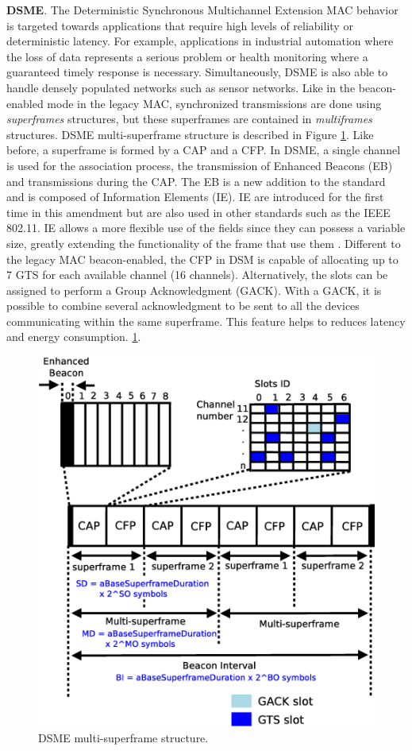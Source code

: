 \documentclass[conference]{IEEEtran}
\begin{document}
\textbf{DSME}. The Deterministic Synchronous Multichannel Extension MAC behavior is targeted towards applications that require high levels of reliability or deterministic latency. For example, applications in industrial automation where the loss of data represents a serious problem or health monitoring where a guaranteed timely response is necessary. Simultaneously, DSME is also able to handle densely populated networks such as sensor networks. Like in the beacon-enabled mode in the legacy MAC, synchronized  transmissions are done using \textit{superframes} structures, but these superframes are contained in \textit{multiframes} structures. DSME multi-superframe structure is described in Figure \ref{fig:dsmeSuperframe}. Like before, a superframe is formed by a CAP and a CFP. In DSME, a single channel is used for the association process, the transmission of Enhanced Beacons (EB) and transmissions during the CAP. The EB is a new addition to the standard and is composed of Information Elements (IE). IE are introduced for the first time in this amendment but are also used in other standards such as the IEEE 802.11. IE allows a more flexible use of the fields since they can possess a variable size, greatly extending the functionality of the frame that use them . Different to the legacy MAC beacon-enabled, the CFP in DSM is capable of allocating up to 7 GTS for each available channel (16 channels). Alternatively, the slots can be assigned to perform a Group Acknowledgment (GACK). With a GACK, it is possible to combine several acknowledgment to be sent to all the devices communicating within the same superframe. This feature helps to  reduces latency and energy consumption.
\ref{fig:dsmeSuperframe}.
\begin{figure}[!htb]
\centering
\includegraphics[scale=.28]{dsmeSuperframe}
\caption{DSME multi-superframe structure.}
\label{fig:dsmeSuperframe}
\end{figure}
\end{document}

